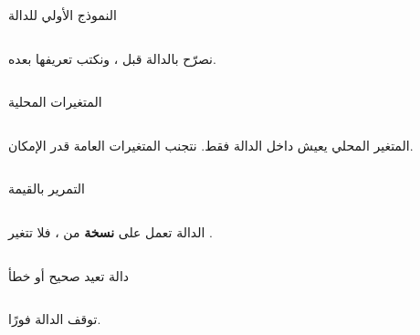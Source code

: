 \documentclass[aspectratio=169, 11pt, t, xcolor={table}]{beamer}
\begin{document}
\begin{frame}[t]{النموذج الأولي للدالة}
    \begin{columns}[T]
        {\small نصرّح بالدالة قبل ، ونكتب تعريفها بعده.\par}
        \vspace{0.3cm}
    \end{columns}
\end{frame}

\begin{frame}[t]{المتغيرات المحلية}
    \begin{columns}[T]
        {\small المتغير المحلي يعيش داخل الدالة فقط. نتجنب المتغيرات العامة قدر الإمكان.\par}
        \vspace{0.3cm}
    \end{columns}
\end{frame}

\begin{frame}[t]{التمرير بالقيمة}
    \begin{columns}[T]
        {\small الدالة تعمل على \textbf{نسخة} من ، فلا تتغير .\par}
        \vspace{0.3cm}
    \end{columns}
\end{frame}

\begin{frame}[t]{دالة تعيد صحيح أو خطأ}
    \begin{columns}[T]
        {\small {} توقف الدالة فورًا.\par}
        \vspace{0.3cm}
    \end{columns}
\end{frame}
\end{document}
